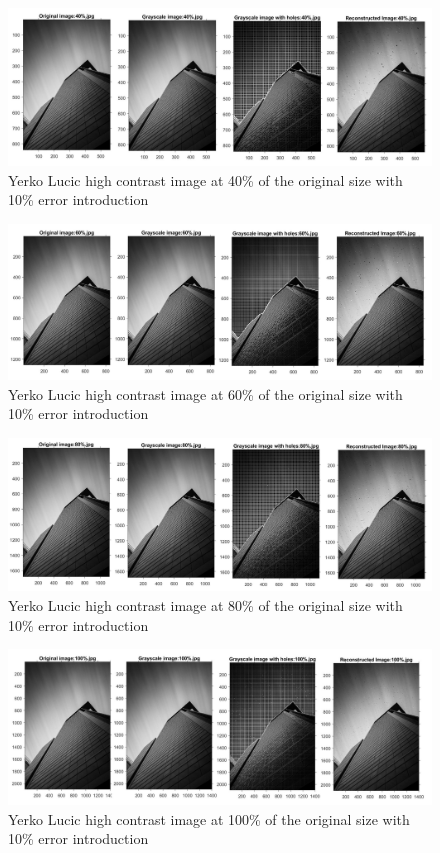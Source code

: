 \begin{figure}[!ht]
\center \includegraphics[scale=0.31]{YerkoLucic40.jpg}
\caption{Yerko Lucic high contrast image at 40\% of the original size with 10\% error introduction}
\label{fig:YerkoLucic40}
\end{figure}

\begin{figure}[!ht]
\center \includegraphics[scale=0.31]{YerkoLucic60.jpg}
\caption{Yerko Lucic high contrast image at 60\% of the original size with 10\% error introduction}
\label{fig:YerkoLucic60}
\end{figure}

\begin{figure}[!ht]
\center \includegraphics[scale=0.31]{YerkoLucic80.jpg}
\caption{Yerko Lucic high contrast image at 80\% of the original size with 10\% error introduction}
\label{fig:YerkoLucic80}
\end{figure}

\begin{figure}[!ht]
\center \includegraphics[scale=0.31]{YerkoLucic100.jpg}
\caption{Yerko Lucic high contrast image at 100\% of the original size with 10\% error introduction}
\label{fig:YerkoLucic100}
\end{figure}

